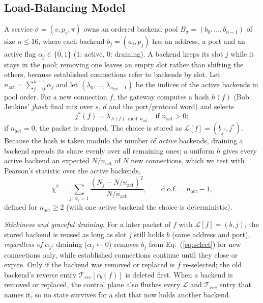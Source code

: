 \documentclass[conference]{IEEEtran}
\begin{document}
\subsection{Load-Balancing Model}
A service $\sigma=(v,p_v,\pi)$ owns an ordered backend pool
$B_\sigma=(b_0,\dots,b_{n-1})$ of size $n \le 16$, where each backend
$b_j=(a_j, p_j)$ has an address, a port and an active flag $\alpha_j\in\{0,1\}$
($1$: active, $0$: draining). A backend keeps its slot $j$ while it stays in
the pool; removing one leaves an empty slot rather than shifting the others,
because established connections refer to backends by slot.
Let $n_{\mathrm{act}} = \sum_{j=0}^{n-1}\alpha_j$ and let
$(\lambda_0,\dots,\lambda_{n_{\mathrm{act}}-1})$ be the indices of the active
backends in pool order. For a new connection $f$, the gateway computes a hash
$h(f)$ (Bob Jenkins' \textit{jhash} final mix over $s$, $d$ and the
port/protocol word) and selects
\begin{equation}
j^*(f) = \lambda_{\,h(f) \bmod n_{\mathrm{act}}}
\quad \text{if } n_{\mathrm{act}} > 0;
\label{eq:select}
\end{equation}
if $n_{\mathrm{act}} = 0$, the packet is dropped. The choice is stored as
$\mathcal{L}[f]=(b_{j^*}, j^*)$. Because the hash is taken modulo the number
of \emph{active} backends, draining a backend spreads its share evenly over
all remaining ones; a uniform $h$ gives every active backend an expected
$N/n_{\mathrm{act}}$ of $N$ new connections, which we test with Pearson's
statistic over the active backends,
\begin{equation}
\chi^2 = \sum_{j:\,\alpha_j=1} \frac{(N_j - N/n_{\mathrm{act}})^2}{N/n_{\mathrm{act}}},
\qquad \text{d.o.f.} = n_{\mathrm{act}}-1,
\label{eq:chi2}
\end{equation}
defined for $n_{\mathrm{act}} \ge 2$ (with one active backend the choice is
deterministic).

\textit{Stickiness and graceful draining.} For a later packet of $f$ with
$\mathcal{L}[f]=(b,j)$, the stored backend is reused as long as slot $j$ still
holds $b$ (same address and port), \emph{regardless of} $\alpha_j$: draining
($\alpha_j \gets 0$) removes $b_j$ from Eq.~(\ref{eq:select}) for new
connections only, while established connections continue until they close or
expire. Only if the backend was removed or replaced is $f$ re-selected; the
old backend's reverse entry $\mathcal{T}_{rev}[r_{b}(f)]$ is deleted first.
When a backend is removed or replaced, the control plane also flushes every
$\mathcal{L}$ and $\mathcal{T}_{rev}$ entry that names it, so no state
survives for a slot that now holds another backend.
\end{document}

